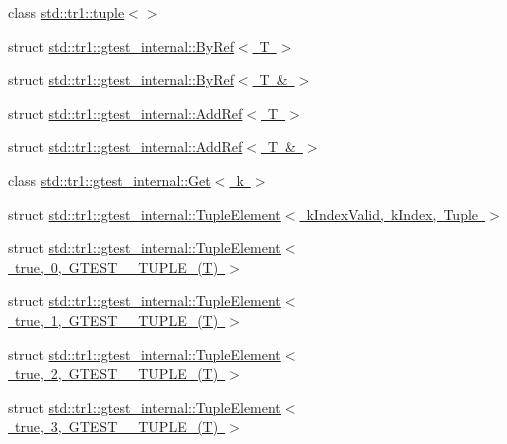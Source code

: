 \begin{DoxyCompactItemize}
\item 
class \mbox{\hyperlink{classstd_1_1tr1_1_1tuple}{std\+::tr1\+::tuple$<$$>$}}
\item 
struct \mbox{\hyperlink{structstd_1_1tr1_1_1gtest__internal_1_1_by_ref}{std\+::tr1\+::gtest\+\_\+internal\+::\+By\+Ref$<$ T $>$}}
\item 
struct \mbox{\hyperlink{structstd_1_1tr1_1_1gtest__internal_1_1_by_ref_3_01_t_01_6_01_4}{std\+::tr1\+::gtest\+\_\+internal\+::\+By\+Ref$<$ T \& $>$}}
\item 
struct \mbox{\hyperlink{structstd_1_1tr1_1_1gtest__internal_1_1_add_ref}{std\+::tr1\+::gtest\+\_\+internal\+::\+Add\+Ref$<$ T $>$}}
\item 
struct \mbox{\hyperlink{structstd_1_1tr1_1_1gtest__internal_1_1_add_ref_3_01_t_01_6_01_4}{std\+::tr1\+::gtest\+\_\+internal\+::\+Add\+Ref$<$ T \& $>$}}
\item 
class \mbox{\hyperlink{classstd_1_1tr1_1_1gtest__internal_1_1_get}{std\+::tr1\+::gtest\+\_\+internal\+::\+Get$<$ k $>$}}
\item 
struct \mbox{\hyperlink{structstd_1_1tr1_1_1gtest__internal_1_1_tuple_element}{std\+::tr1\+::gtest\+\_\+internal\+::\+Tuple\+Element$<$ k\+Index\+Valid, k\+Index, Tuple $>$}}
\item 
struct \mbox{\hyperlink{structstd_1_1tr1_1_1gtest__internal_1_1_tuple_element_3_01true_00_010_00_01_g_t_e_s_t__10___t_u_p_l_e___07_t_08_01_4}{std\+::tr1\+::gtest\+\_\+internal\+::\+Tuple\+Element$<$ true, 0, G\+T\+E\+S\+T\+\_\+\_\+\+T\+U\+P\+L\+E\+\_\+(\+T) $>$}}
\item 
struct \mbox{\hyperlink{structstd_1_1tr1_1_1gtest__internal_1_1_tuple_element_3_01true_00_011_00_01_g_t_e_s_t__10___t_u_p_l_e___07_t_08_01_4}{std\+::tr1\+::gtest\+\_\+internal\+::\+Tuple\+Element$<$ true, 1, G\+T\+E\+S\+T\+\_\+\_\+\+T\+U\+P\+L\+E\+\_\+(\+T) $>$}}
\item 
struct \mbox{\hyperlink{structstd_1_1tr1_1_1gtest__internal_1_1_tuple_element_3_01true_00_012_00_01_g_t_e_s_t__10___t_u_p_l_e___07_t_08_01_4}{std\+::tr1\+::gtest\+\_\+internal\+::\+Tuple\+Element$<$ true, 2, G\+T\+E\+S\+T\+\_\+\_\+\+T\+U\+P\+L\+E\+\_\+(\+T) $>$}}
\item 
struct \mbox{\hyperlink{structstd_1_1tr1_1_1gtest__internal_1_1_tuple_element_3_01true_00_013_00_01_g_t_e_s_t__10___t_u_p_l_e___07_t_08_01_4}{std\+::tr1\+::gtest\+\_\+internal\+::\+Tuple\+Element$<$ true, 3, G\+T\+E\+S\+T\+\_\+\_\+\+T\+U\+P\+L\+E\+\_\+(\+T) $>$}}
\item 

\end{DoxyCompactItemize}
